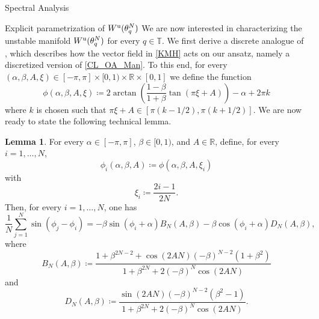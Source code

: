 \documentclass{article}
\theoremstyle{definition}
\newtheorem{lemma}[definition]{Lemma}
\newcommand{\R}{\mathbb{R}}
\newcommand{\T}{\mathbb{T}}
\renewcommand{\u}{\textnormal{u}}
\begin{document}
\begin{section}{Spectral Analysis}



\end{section}
\begin{section}{Explicit parametrization of $W^\u(\theta^N_q)$}\label{main_sec}
We are now interested in characterizing the unstable manifold $W^\u(\theta^N_q)$ for every $q\in\T$. We first derive a discrete analogue of \cite[Lemma 2.5]{kuehn2025mean}, which describes how the vector field in \eqref{KMH} acts on our ansatz, namely a discretized version of \eqref{CL_OA_Man}. To this end, for every $(\alpha,\beta,A,\xi)\in[-\pi,\pi]\times[0,1)\times\R\times[0,1]$ we define the function
\begin{equation}\label{continuous_ansatz}
    \phi(\alpha,\beta,A,\xi)\coloneqq2\arctan\left(\frac{1-\beta}{1+\beta}\tan\left(\pi\xi+A\right)\right)-\alpha+2\pi k
\end{equation}
where $k$ is chosen such that $\pi\xi+A\in[\pi(k-1/2),\pi(k+1/2)]$. We are now ready to state the following technical lemma.
\begin{lemma}\label{discrete_lemma}
For every $\alpha\in[-\pi,\pi]$, $\beta\in[0,1)$, and $A\in\R$, define, for every $i=1,\ldots,N$,
\begin{equation}\label{fin_N_ansatz}
    \phi_i(\alpha,\beta,A)\coloneqq\phi(\alpha,\beta,A,\xi_i)
\end{equation}
with
$$\xi_i\coloneqq\frac{2i-1}{2N}.$$
Then, for every $i=1,\ldots,N$, one has
\begin{equation}\label{discrete_formula}
    \frac{1}{N}\sum_{j=1}^N\sin\left(\phi_j-\phi_i\right)=-\beta\sin(\phi_i+\alpha)B_N(A,\beta)-\beta\cos(\phi_i+\alpha)D_N(A,\beta),
\end{equation}
where
$$B_N(A,\beta)\coloneqq\frac{1+\beta^{2N-2}+\cos(2AN)(-\beta)^{N-2}(1+\beta^2)}{1+\beta^{2N}+2(-\beta)^N\cos(2AN)}$$
and
$$D_N(A,\beta)\coloneqq\frac{\sin(2AN)(-\beta)^{N-2}(\beta^2-1)}{1+\beta^{2N}+2(-\beta)^N\cos(2AN)}.$$
\end{lemma}


\end{section}
\end{document}

